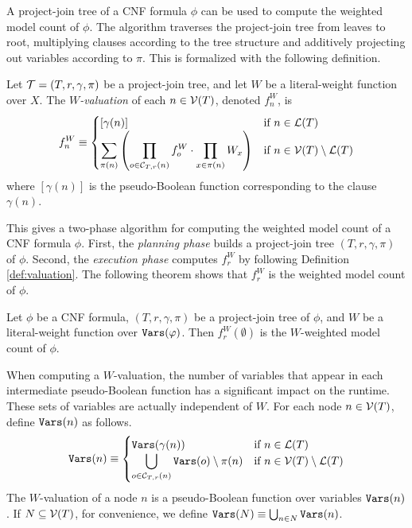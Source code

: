 A project-join tree of a CNF formula $\phi$ can be used to compute the weighted model count of $\phi$. 
The algorithm traverses the project-join tree from leaves to root, multiplying clauses according to the tree structure and additively projecting out variables according to $\pi$. 
This is formalized with the following definition.
\begin{definition}\label{def:valuation}
    Let $\mathcal{T} = (T, r, \gamma, \pi)$ be a project-join tree, and let $W$ be a literal-weight function over $X$. The \emph{$W$-valuation} of each $n \in \mathcal{V}(T)$, denoted $f^W_n$, is
    \begin{align*}
        f^W_n \equiv
        \begin{cases}
            [\gamma(n)] & \text{if } n \in \mathcal{L}(T) \\
            \displaystyle
            {\sum_{\pi(n)} \left(  \prod_{o \in \mathcal{C}_{T,r}(n)} f^W_o \cdot \prod_{x \in \pi(n)} W_x  \right)} & \text{if } n \in \mathcal{V}(T) \setminus \mathcal{L}(T)
        \end{cases}
    \end{align*}
    where $[\gamma(n)]$ is the pseudo-Boolean function corresponding to the clause $\gamma(n)$.
\end{definition}

This gives a two-phase algorithm for computing the weighted model count of a CNF formula $\phi$. First, the \emph{planning phase} builds a project-join tree $(T, r, \gamma, \pi)$ of $\phi$. Second, the \emph{execution phase} computes $f^W_r$ by following Definition \ref{def:valuation}. The following theorem shows that $f^W_r$ is the weighted model count of $\phi$.
\begin{theorem}
\label{thm_valuation_wmc_procount}
    Let $\phi$ be a CNF formula, $(T, r, \gamma, \pi)$ be a project-join tree of $\phi$, and $W$ be a literal-weight function over $\texttt{\upshape Vars}(\varphi)$. Then $f^W_r(\emptyset)$ is the $W$-weighted model count of $\phi$.
\end{theorem}

When computing a $W$-valuation, the number of variables that appear in each intermediate pseudo-Boolean function has a significant impact on the runtime. These sets of variables are actually independent of $W$. For each node $n \in \mathcal{V}(T)$, define $\texttt{\upshape Vars}(n)$ as follows.
\begin{align*}
    \texttt{\upshape Vars}(n) \equiv
    \begin{cases}
        \texttt{\upshape Vars}(\gamma(n)) & \text{if } n \in \mathcal{L}(T) \\
        \displaystyle
        \bigcup_{o \in \mathcal{C}_{T,r}(n)} \texttt{\upshape Vars}(o) \setminus \pi(n) & \text{if } n \in \mathcal{V}(T) \setminus \mathcal{L}(T)
    \end{cases}
\end{align*}
The $W$-valuation of a node $n$ is a pseudo-Boolean function over variables $\texttt{\upshape Vars}(n)$. 
If $N \subseteq \mathcal{V}(T)$, for convenience, we define $\texttt{\upshape Vars}(N) \equiv \bigcup_{n \in N} \texttt{\upshape Vars}(n)$.

